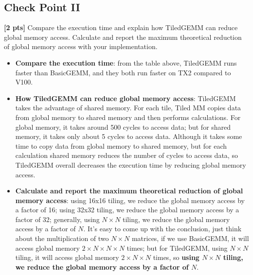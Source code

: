 \documentclass{mcmthesis}
\begin{document}
\subsection{Check Point II}
\textbf{[2 pts]} Compare the execution time and explain how TiledGEMM can reduce global memory access. Calculate and report the maximum theoretical reduction of global memory access with your implementation.
\begin{itemize}
\item \textbf{Compare the execution time}: from the table above, TiledGEMM runs faster than BasicGEMM, and they both run faster on TX2 compared to V100.
\item \textbf{How TiledGEMM can reduce global memory access}: TiledGEMM takes the advantage of shared memory. For each tile, Tiled MM copies data from global memory to shared memory and then performs calculations. For global memory, it takes around 500 cycles to access data; but for shared memory, it takes only about 5 cycles to access data. Although it takes some time to copy data from global memory to shared memory, but for each calculation shared memory reduces the number of cycles to access data, so TiledGEMM overall decreases the execution time by reducing global memory access.
\item \textbf{Calculate and report the maximum theoretical reduction of global memory access}: using 16x16 tiling, we reduce the global memory access by a factor of 16; using 32x32 tiling, we reduce the global memory access by a factor of 32; generally, using $N \times N$ tiling, we reduce the global memory access by a factor of $N$. It's easy to come up with the conclusion, just think about the multiplication of two $N \times N$ matrices, if we use BasicGEMM, it will access global memory $2 \times N \times N \times N$ times; but for TiledGEMM, using $N \times N$ tiling, it will access global memory $2 \times N \times N$ times, so \textbf{using $N \times N$ tiling, we reduce the global memory access by a factor of $N$}.
\end{itemize}
\end{document}
